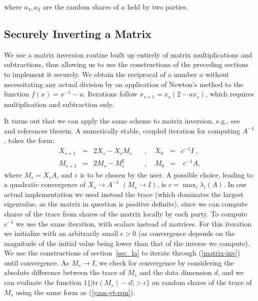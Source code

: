 \documentclass[11pt]{article}
\begin{document}
\noindent where $a_1,a_2$ are the random shares of $a$ held by two parties.

\subsection{Securely Inverting a Matrix}\label{sec:matrix_inversion}

We use a matrix inversion routine  built up entirely of matrix multiplications and subtractions, thus allowing us to use the constructions of the preceding sections to implement it securely. We obtain the reciprocal of a number $a$  without necessitating any actual division  by an application of Newton's method to the function $f(x)=x^{-1}-a$. Iterations follow $x_{s+1}=x_s(2-ax_s)$, which requires multiplication and subtraction only.

It turns out that we can apply the same scheme   to matrix inversion,  e.g.,  see~\cite{guo_higham} and references therein. A numerically stable, coupled iteration for computing $A^{-1}$, takes the form:
\begin{equation}\label{matrix-inv}
\begin{array}{llllll}
X_{s+1} &=& 2X_s-X_sM_s  & \quad , \quad X_0 &=& c^{-1}I \; ,\\
M_{s+1}&=& 2M_s-M_s^2 & \quad , \quad  M_0 &=& \; c^{-1}A,
\end{array}
\end{equation}
where $M_s = X_s A$, and $c$ is to be chosen by the user. A possible choice, leading to a quadratic convergence of $X_s\rightarrow A^{-1}$ $(M_s \rightarrow I)$, is $c=\max_i \lambda_i(A)$. In our actual implementation we used instead the trace (which dominates the largest eigenvalue, as the matrix in question is positive definite), since we can compute shares of the trace from shares of the matrix locally by each party. To compute $c^{-1}$ we use the same iteration, with scalars instead of matrices.  For this iteration we initialize with an arbitrarily small $\epsilon>0$ (as convergence depends on the magnitude of the initial value being lower than that of the inverse we compute).  We use the constructions of section~\ref{sec_la} to iterate through (\ref{matrix-inv}) until convergence. As $M_s\rightarrow I$, we check for convergence by considering the absolute difference between the trace of $M_s$ and the data dimension $d$, and we can evaluate the function $1\{|\text{tr}(M_s)-d|>\epsilon\}$ on random shares of the trace of $M_s$ using the same form as (\ref{yaos-gt-eqn}).
\end{document}
